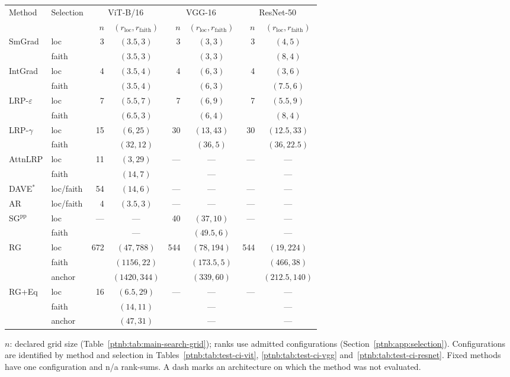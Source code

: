 \begin{tabular}{@{}ll rc rc rc@{}}
\toprule
Method & Selection & \multicolumn{2}{c}{ViT-B/16} & \multicolumn{2}{c}{VGG-16} & \multicolumn{2}{c}{ResNet-50} \\
 & & $n$ & $(r_{\mathrm{loc}},r_{\mathrm{faith}})$ & $n$ & $(r_{\mathrm{loc}},r_{\mathrm{faith}})$ & $n$ & $(r_{\mathrm{loc}},r_{\mathrm{faith}})$ \\
\midrule
SmGrad & loc & 3 & $(3.5,3)$ & 3 & $(3,3)$ & 3 & $(4,5)$ \\
 & faith &  & $(3.5,3)$ &  & $(3,3)$ &  & $(8,4)$ \\
\addlinespace
IntGrad & loc & 4 & $(3.5,4)$ & 4 & $(6,3)$ & 4 & $(3,6)$ \\
 & faith &  & $(3.5,4)$ &  & $(6,3)$ &  & $(7.5,6)$ \\
\addlinespace
LRP-$\varepsilon$ & loc & 7 & $(5.5,7)$ & 7 & $(6,9)$ & 7 & $(5.5,9)$ \\
 & faith &  & $(6.5,3)$ &  & $(6,4)$ &  & $(8,4)$ \\
\addlinespace
LRP-$\gamma$ & loc & 15 & $(6,25)$ & 30 & $(13,43)$ & 30 & $(12.5,33)$ \\
 & faith &  & $(32,12)$ &  & $(36,5)$ &  & $(36,22.5)$ \\
\addlinespace
AttnLRP & loc & 11 & $(3,29)$ & --- & --- & --- & --- \\
 & faith &  & $(14,7)$ &  & --- &  & --- \\
\addlinespace
DAVE$^{*}$ & loc/faith & 54 & $(14,6)$ & --- & --- & --- & --- \\
\addlinespace
AR & loc/faith & 4 & $(3.5,3)$ & --- & --- & --- & --- \\
\addlinespace
SG$^{\mathrm{pp}}$ & loc & --- & --- & 40 & $(37,10)$ & --- & --- \\
 & faith &  & --- &  & $(49.5,6)$ &  & --- \\
\addlinespace
RG & loc & 672 & $(47,788)$ & 544 & $(78,194)$ & 544 & $(19,224)$ \\
 & faith &  & $(1156,22)$ &  & $(173.5,5)$ &  & $(466,38)$ \\
 & anchor &  & $(1420,344)$ &  & $(339,60)$ &  & $(212.5,140)$ \\
\addlinespace
RG+Eq & loc & 16 & $(6.5,29)$ & --- & --- & --- & --- \\
 & faith &  & $(14,11)$ &  & --- &  & --- \\
 & anchor &  & $(47,31)$ &  & --- &  & --- \\
\bottomrule
\end{tabular}
\par\smallskip\noindent
$n$: declared grid size (Table~\ref{ptnb:tab:main-search-grid}); ranks use admitted configurations (Section~\ref{ptnb:app:selection}).
Configurations are identified by method and selection in Tables~\ref{ptnb:tab:test-ci-vit}, \ref{ptnb:tab:test-ci-vgg} and~\ref{ptnb:tab:test-ci-resnet}.
Fixed methods have one configuration and n/a rank-sums. A dash marks an architecture on which the method was not evaluated.
